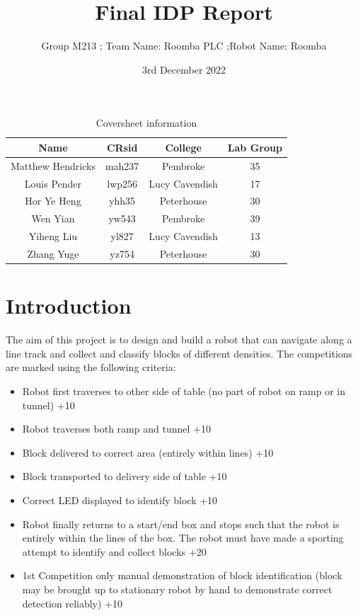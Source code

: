 \documentclass{article}
\title{Final IDP Report}
\author{Group M213 ; Team Name: Roomba PLC ;Robot Name: Roomba}
\date{3rd December 2022}
\begin{document}
\maketitle


\begin{table}[]
    \centering
    \begin{tabular}{|c|c|c|c|}
        \hline
        Name &  CRsid & College & Lab Group \\
        \hline
        Matthew Hendricks & mah237 & Pembroke & 35 \\
        Louis Pender & lwp256 & Lucy Cavendish & 17 \\
        Hor Ye Heng & yhh35 & Peterhouse & 30 \\
        Wen Yian & yw543 & Pembroke & 39 \\
        Yiheng Liu & yl827 & Lucy Cavendish & 13 \\
        Zhang Yuge & yz754 & Peterhouse & 30 \\
        \hline
    \end{tabular}
    \caption{Coversheet information}
    \label{tab:Coversheet}
\end{table}


\newpage

\section{Introduction}
\quad The aim of this project is to design and build a robot that can navigate along a line track and collect and classify blocks of different densities. The competitions are marked using the following criteria:

\begin{itemize}
    \item Robot first traverses to other side of table (no part of robot on ramp or in tunnel) +10
    \item Robot traverses both ramp and tunnel +10
    \item Block delivered to correct area (entirely within lines) +10
    \item Block transported to delivery side of table +10
    \item Correct LED displayed to identify block +10
    \item Robot finally returns to a start/end box and stops such that the robot is entirely within the lines of the box. The robot must have made a sporting attempt to identify and collect blocks +20 
    \item 1st Competition only manual demonstration of block identification (block may be brought up to stationary robot by hand to demonstrate correct detection reliably) +10
\end{itemize}
\end{document}
